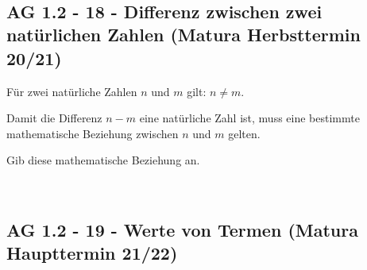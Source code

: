\documentclass[a4paper,12pt]{article}
\begin{document}

\newpage

\smallskip\begin{minipage}{1\textwidth}
 \flagUK\ \vspace{-0.5cm}

\subsection{AG 1.2 - 18 - Differenz zwischen zwei natürlichen Zahlen (Matura Herbsttermin 20/21)}\smallskip

\end{minipage}

\begin{beispiel}[AG 1.2]{1}
Für zwei natürliche Zahlen $n$ und $m$ gilt: $n\neq m$.

Damit die Differenz $n-m$ eine natürliche Zahl ist, muss eine bestimmte mathematische Beziehung zwischen $n$ und $m$ gelten.

Gib diese mathematische Beziehung an.

\end{beispiel}


\newpage

\smallskip\begin{minipage}{1\textwidth}
 \flagUK\ \vspace{-0.5cm}

\subsection{AG 1.2 - 19 - Werte von Termen (Matura Haupttermin 21/22)}\smallskip

\end{minipage}
\end{document}
